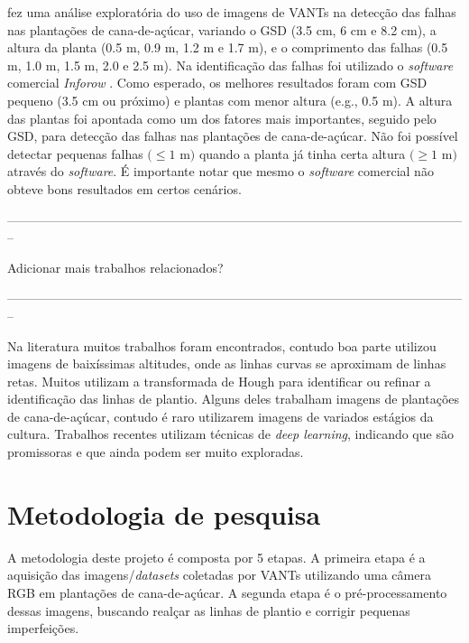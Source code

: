 \documentclass[12pt, a4paper, english, brazil]{article}
\newcommand{\textRed}[1]{{{\color{red} #1}}}
\newcommand{\linePage}{--------------------------------------------------------------------------------------------------------------}
\begin{document}


 fez uma análise exploratória do uso de imagens de VANTs na detecção das falhas nas plantações de cana-de-açúcar, variando o GSD (3.5 cm, 6 cm e 8.2 cm), a altura da planta (0.5 m, 0.9 m, 1.2 m e 1.7 m), e o comprimento das falhas (0.5 m, 1.0 m, 1.5 m, 2.0 e 2.5 m). Na identificação das falhas foi utilizado o \textit{software} comercial \textit{Inforow} \cite{Inforow_2021}. Como esperado, os melhores resultados foram com GSD pequeno (3.5 cm ou próximo) e plantas com menor altura (e.g., 0.5 m). A altura das plantas foi apontada como um dos fatores mais importantes, seguido pelo GSD, para detecção das falhas nas plantações de cana-de-açúcar. Não foi possível detectar pequenas falhas $(\le 1$ m$)$ quando a planta já tinha certa altura $(\ge 1$ m$)$ através do \textit{software}. É importante notar que mesmo o \textit{software} comercial não obteve bons resultados em certos cenários.

\linePage

\textRed{Adicionar mais trabalhos relacionados?}

\linePage

Na literatura muitos trabalhos foram encontrados, contudo boa parte utilizou imagens de baixíssimas altitudes, onde as linhas curvas se aproximam de linhas retas. Muitos utilizam a transformada de Hough para identificar ou refinar a identificação das linhas de plantio. Alguns deles trabalham imagens de plantações de cana-de-açúcar, contudo é raro utilizarem imagens de variados estágios da cultura. Trabalhos recentes utilizam técnicas de \textit{deep learning}, indicando que são promissoras e que ainda podem ser muito exploradas.

\section{Metodologia de pesquisa}

A metodologia deste projeto é composta por 5 etapas. A primeira etapa é a aquisição das imagens/\textit{datasets} coletadas por VANTs utilizando uma câmera RGB em plantações de cana-de-açúcar. A segunda etapa é o pré-processamento dessas imagens, buscando realçar as linhas de plantio e corrigir pequenas imperfeições.
\end{document}
